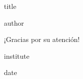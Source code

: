 \documentclass[10pt]{beamer}
\begin{document}
	\begin{frame}
		\vbox{}
		\vspace{0.25em}
		\begin{centering}
			{\inserttitlegraphic\par}
			\vspace{0.5em}
			\begin{beamercolorbox}[sep=8pt,center,rounded=true]{title}
				\inserttitle\par%
				\ifx\insertsubtitle\@empty%
				\else%
				\vspace{0.25em}
				{\insertsubtitle\par}%
				\fi%
			\end{beamercolorbox}%
			\vfill
			\begin{beamercolorbox}[sep=8pt,center]{author}
				\insertauthor
			\end{beamercolorbox}
			\vspace{0.5em}
			{\Large\textcolor{UDCpink}{¡Gracias por su atención!}\par}
			\vspace{0.5em}
			\begin{beamercolorbox}[sep=8pt,center]{institute}
				\insertinstitute
			\end{beamercolorbox}
			\begin{beamercolorbox}[sep=8pt,right]{date}
				\itshape{}\insertdate
			\end{beamercolorbox}
		\end{centering}
		\vspace{0.25em}
	\end{frame}
\end{document}
